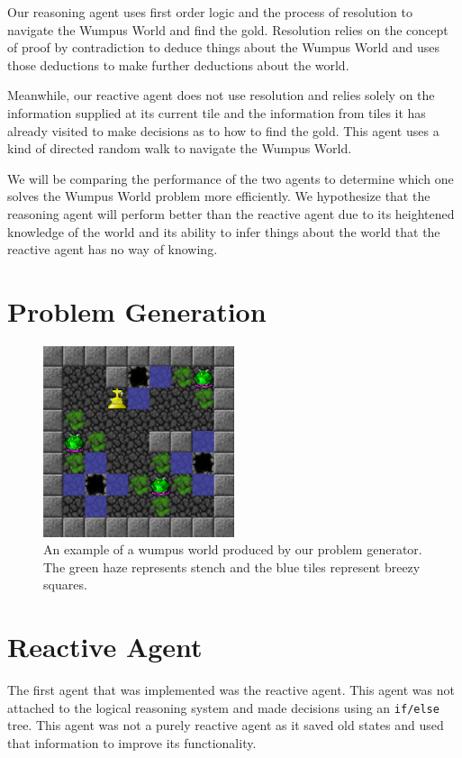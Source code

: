\documentclass{article}
\begin{document}
		 Our reasoning agent uses first order logic and the process of resolution to navigate the Wumpus World and find the gold. Resolution relies on the concept of proof by contradiction to deduce things about the Wumpus World and uses those deductions to make further deductions about the world.
		 
		 Meanwhile, our reactive agent does not use resolution and relies solely on the information supplied at its current tile and the information from tiles it has already visited to make decisions as to how to find the gold. This agent uses a kind of directed random walk to navigate the Wumpus World.
		 
		 We will be comparing the performance of the two agents to determine which one solves the Wumpus World problem more efficiently. We hypothesize that the reasoning agent will perform better than the reactive agent due to its heightened knowledge of the world and its ability to infer things about the world that the reactive agent has no way of knowing.
		 


\section{Problem Generation}
\begin{figure}
	\centering
	\includegraphics[width=0.5\textwidth]{images/ex_ww}
	\caption{An example of a wumpus world produced by our problem generator. The green haze represents stench and the blue tiles represent breezy squares.}
	\label{ex_ww}
\end{figure}
\section{Reactive Agent}
The first agent that was implemented was the reactive agent.
 This agent was not attached to the logical reasoning system and made decisions using an \texttt{if/else} tree.
  This agent was not a purely reactive agent as it saved old states and used that information to improve its functionality\cite{reactive}.
  
\end{document}
